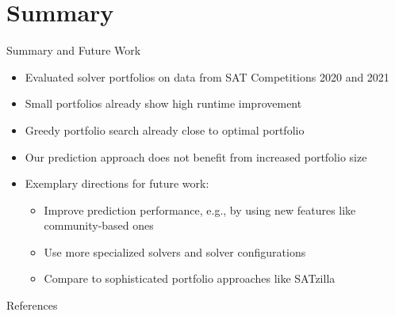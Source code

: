 \documentclass[en]{sdqbeamer}
\begin{document}
\section{Summary}

\begin{frame}[t]{Summary and Future Work}
	\begin{itemize}
		\item Evaluated solver portfolios on data from SAT Competitions 2020 and 2021
		\pause
		\item Small portfolios already show high runtime improvement
		\pause
		\item Greedy portfolio search already close to optimal portfolio
		\pause
		\item Our prediction approach does not benefit from increased portfolio size
		\pause
		\vspace{\baselineskip}
		\item Exemplary directions for future work:
		\begin{itemize}
			\item Improve prediction performance, e.g., by using new features like community-based ones~\cite{Ansotegui:2019:CommunityStructure, Li:2021:HCS}
			\item Use more specialized solvers and solver configurations
			\item Compare to sophisticated portfolio approaches like SATzilla~\cite{xu2008satzilla, xu2012satzilla2012}
		\end{itemize}
	\end{itemize}
\end{frame}

\appendix
\beginbackup %

\begin{frame}[t, allowframebreaks]{References}
	\printbibliography
\end{frame}

\backupend
\end{document}
